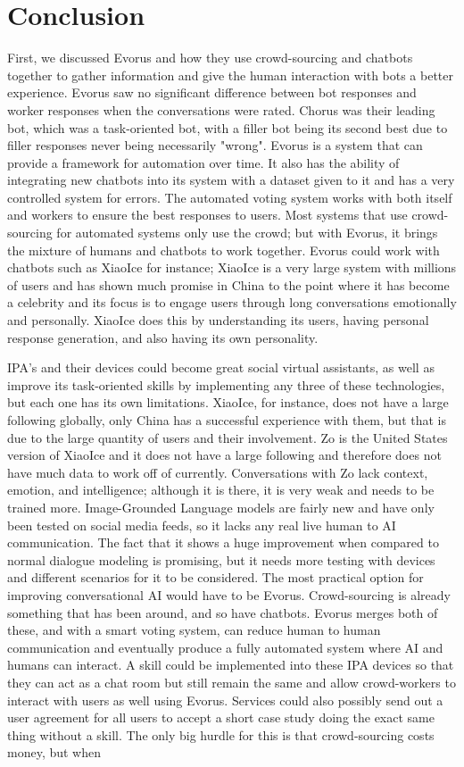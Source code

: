 \documentclass[letterpaper, 10 pt, conference]{IEEEtran}
\begin{document}
\section{Conclusion}
First, we discussed Evorus and how they use crowd-sourcing and chatbots together to gather information and give the human interaction with bots a better experience. Evorus saw no significant difference between bot responses and worker responses when the conversations were rated. Chorus was their leading bot, which was a task-oriented bot, with a filler bot being its second best due to filler responses never being necessarily "wrong". Evorus is a system that can provide a framework for automation over time. It also has the ability of integrating new chatbots into its system with a dataset given to it and has a very controlled system for errors. The automated voting system works with both itself and workers to ensure the best responses to users. Most systems that use crowd-sourcing for automated systems only use the crowd; but with Evorus, it brings the mixture of humans and chatbots to work together. Evorus could work with chatbots such as XiaoIce for instance; XiaoIce is a very large system with millions of users and has shown much promise in China to the point where it has become a celebrity and its focus is to engage users through long conversations emotionally and personally. XiaoIce does this by understanding its users, having personal response generation, and also having its own personality. \par IPA's and their devices could become great social virtual assistants, as well as improve its task-oriented skills by implementing any three of these technologies, but each one has its own limitations. XiaoIce, for instance, does not have a large following globally, only China has a successful experience with them, but that is due to the large quantity of users and their involvement. Zo is the United States version of XiaoIce and it does not have a large following and therefore does not have much data to work off of currently. Conversations with Zo lack context, emotion, and intelligence; although it is there, it is very weak and needs to be trained more. Image-Grounded Language models are fairly new and have only been tested on social media feeds, so it lacks any real live human to AI communication. The fact that it shows a huge improvement when compared to normal dialogue modeling is promising, but it needs more testing with devices and different scenarios for it to be considered. The most practical option for improving conversational AI would have to be Evorus. Crowd-sourcing is already something that has been around, and so have chatbots. Evorus merges both of these, and with a smart voting system, can reduce human to human communication and eventually produce a fully automated system where AI and humans can interact. A skill could be implemented into these IPA devices so that they can act as a chat room but still remain the same and allow crowd-workers to interact with users as well using Evorus. Services could also possibly send out a user agreement for all users to accept a short case study doing the exact same thing without a skill. The only big hurdle for this is that crowd-sourcing costs money, but when 
\end{document}

